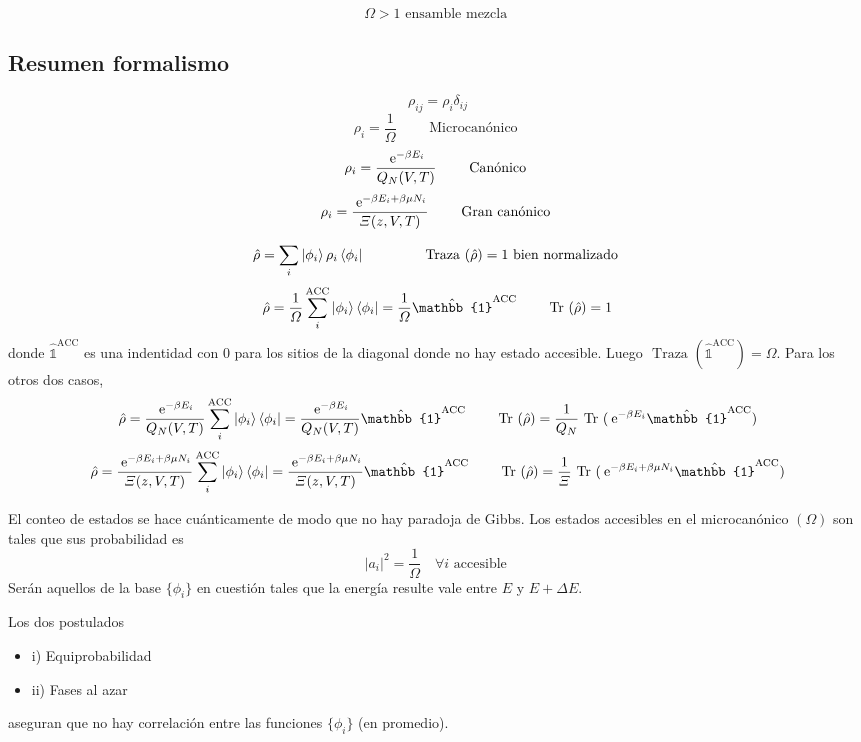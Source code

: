\documentclass[10pt,oneside]{CBFT_book}
\begin{document}
\[
	\Omega > 1 \text{ ensamble mezcla }
\]

\subsection{Resumen formalismo}

\[
	\rho_{ij} = \rho_i \delta_{ij}
\]
\[
	\rho_i = \frac{1}{\Omega} \qquad \text{ Microcanónico }
\]
\[
	\rho_i = \frac{\:\mathrm{e}^{-\beta E_i}}{Q_N(V,T)}  \qquad  \text{ Canónico }
\]
\[
	\rho_i = \frac{\:\mathrm{e}^{-\beta E_i + \beta \mu N_i }}{\Xi(z,V,T)}  \qquad  \text{ Gran canónico }
\]

\[
	\hat{\rho} = \sum_i \Ket{ \phi_i } \rho_i \Bra{ \phi_i } \qquad \qquad \text{ Traza }(\hat{\rho} ) =
	1 \text{ bien normalizado }
\]
\[
	\hat{\rho} = \frac{1}{\Omega} \sum_i^{\text{ACC}} \Ket{ \phi_i } \Bra{ \phi_i } = 
	\frac{1}{\Omega} \hat{\mathbb{1}}^{\text{ACC}}  \qquad \text{ Tr }(\hat{\rho} ) = 1 
\]
donde $ \hat{\mathbb{1}}^{\text{ACC}}  $ es una indentidad con 0 para los sitios de la diagonal donde no hay
estado accesible. Luego $ \text{ Traza }(\hat{\mathbb{1}}^{\text{ACC}})  = \Omega $. Para los otros dos casos,
\[
	\hat{\rho} = \frac{\euler^{-\beta E_i}}{Q_N(V,T)}  \sum_i^{\text{ACC}} \Ket{ \phi_i } \Bra{ \phi_i } = 
	\frac{\euler^{-\beta E_i}}{Q_N(V,T)} \hat{\mathbb{1}}^{\text{ACC}} 
	\qquad \text{ Tr }(\hat{\rho} ) = \frac{1}{Q_N} \text{ Tr }( \euler^{-\beta E_i} \hat{\mathbb{1}}^{\text{ACC}} )
\]
\[
	\hat{\rho} = \frac{\euler^{-\beta E_i + \beta \mu N_i }}{\Xi(z,V,T)} 
	\sum_i^{\text{ACC}} \Ket{ \phi_i } \Bra{ \phi_i } = 
	\frac{\euler^{-\beta E_i + \beta \mu N_i }}{\Xi(z,V,T)} \hat{\mathbb{1}}^{\text{ACC}} 
	\qquad \text{ Tr }(\hat{\rho} ) = 
	\frac{1}{\Xi} \text{ Tr }( \euler^{-\beta E_i + \beta \mu N_i } \hat{\mathbb{1}}^{\text{ACC}} ) 
\]

El conteo de estados se hace cuánticamente de modo que no hay paradoja de Gibbs. Los estados accesibles en el
microcanónico $ (\Omega) $ son tales que sus probabilidad es 
\[
	| a_i |^2 = \frac{1}{\Omega} \quad \forall i \text{ accesible }
\]
Serán aquellos de la base $ \{ \phi_i \} $ en cuestión tales que la energía resulte vale entre $E$ y $E+\Delta E$.

Los dos postulados
\begin{itemize}
 \item i) Equiprobabilidad
 \item ii) Fases al azar
\end{itemize}
aseguran que no hay correlación entre las funciones $ \{ \phi_i \} $ (en promedio).
\end{document}
